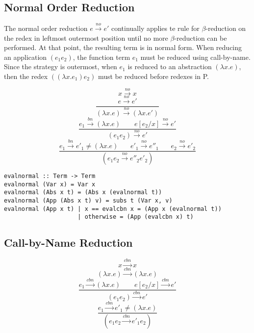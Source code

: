 \documentclass[a4paper,11pt,twoside]{report}
\begin{document}
\subsection{Normal Order Reduction}

The normal order reduction $e\xrightarrow{no} e'$ continually applies te rule for $\beta$-reduction on the redex in leftmost outermost position until no more $\beta$-reduction can be performed. At that point, the resulting term is in normal form. When reducing an application $(e_1e_2)$, the function term $e_1$ must be reduced using call-by-name. Since the strategy is outermost, when $e_1$ is reduced to an abstraction $(\lambda x.e)$, then the redex $((\lambda x.e_1)e_2)$ must be reduced before redexes in P.

\begin{equation*}
x \xrightarrow{no}x
\end{equation*}
\begin{equation*}
\frac{e \xrightarrow{no}e'}{(\lambda x.e) \xrightarrow{no} (\lambda x.e')}
\end{equation*}
\begin{equation*}
\frac{e_1 \xrightarrow{bn} (\lambda x.e)\ \ \ \ \ \ \ \ \ e[e_2/x] \xrightarrow{no} e'}{(e_1e_2) \xrightarrow{no} e'}
\end{equation*}
\begin{equation*}
\frac{e_1 \xrightarrow{bn} e'_1\neq (\lambda x.e)\ \ \ \ \ \ \ \ e'_1\xrightarrow{no} e''_1\ \ \ \ \ \ \ \ e_2\xrightarrow{no} e'_2}{(e_1e_2 \xrightarrow{no}e''_2e'_2)}
\end{equation*}


\begin{verbatim}
evalnormal :: Term -> Term
evalnormal (Var x) = Var x
evalnormal (Abs x t) = (Abs x (evalnormal t))
evalnormal (App (Abs x t) v) = subs t (Var x, v)
evalnormal (App x t) | x == evalcbn x = (App x (evalnormal t))
                     | otherwise = (App (evalcbn x) t)
\end{verbatim}


\subsection{Call-by-Name Reduction}

\begin{equation*}
x \xrightarrow{cbn}x
\end{equation*}
\begin{equation*}
(\lambda x.e) \xrightarrow{cbn} (\lambda x.e)
\end{equation*}
\begin{equation*}
\frac{e_1 \xrightarrow{cbn} (\lambda x.e)\ \ \ \ \ \ \ \ \ e[e_2/x] \xrightarrow{cbn} e'}{(e_1e_2) \xrightarrow{cbn} e'}
\end{equation*}
\begin{equation*}
\frac{e_1 \xrightarrow{cbn} e'_1\neq (\lambda x.e)}{(e_1e_2 \xrightarrow{cbn}e'_1e_2)}
\end{equation*}
\end{document}
